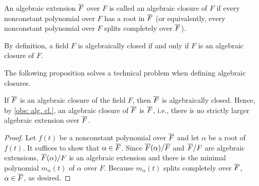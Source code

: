 \begin{defi}
    An algebraic extension $\overline{F}$ over $F$ is called an algebraic closure of $F$ if every nonconstant polynomial over $F$ has a root in $\overline{F}$ (or equivalently, every nonconstant polynomial over $F$ splits completely over $\overline{F}$).
\end{defi}
\begin{rmk}
    By definition, a field $F$ is algebraically closed if and only if $F$ is an algebraic closure of $F$.
\end{rmk}
The following proposition solves a technical problem when defining algebraic closures.
\begin{prop}
    If $\overline{F}$ is an algebraic closure of the field $F$, then $\overline{F}$ is algebraically closed.
    Hence, by \cref{obs: alg. cl.}, an algebraic closure of $\overline{F}$ is $\overline{F}$, i.e., there is no strictly larger algebraic extension over $\overline{F}$.
\end{prop}
\begin{proof}
    Let $f(t)$ be a nonconstant polynomial over $\overline{F}$ and let $\alpha$ be a root of $f(t)$.
    It suffices to show that $\alpha\in\overline{F}$.
    Since $\overline{F}(\alpha)/\overline{F}$ and $\overline{F}/F$ are algebraic extensions, $\overline{F}(\alpha)/F$ is an algebraic extension and there is the minimal polynomial $m_\alpha(t)$ of $\alpha$ over $F$.
    Because $m_\alpha(t)$ splits completely over $\overline{F}$, $\alpha\in\overline{F}$, as desired.
\end{proof}

